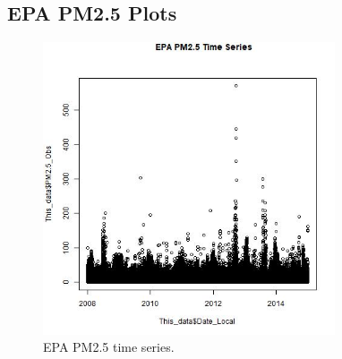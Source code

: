 
\subsection{EPA PM2.5 Plots}
\begin{figure} 
\centering 
\includegraphics[width=0.77\textwidth]{Code_Outputs/EPA_PM25_time_series.jpg} 
\caption{\label{fig:EPA_PM25TS}EPA PM2.5 time series.} 
\end{figure} 
 
